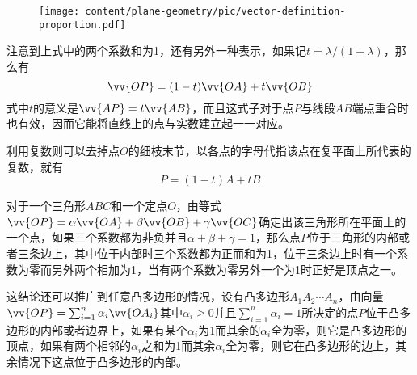 \begin{figure}[htbp]
\centering
\texttt{[image: content/plane-geometry/pic/vector-definition-proportion.pdf]}
\caption{}
\label{fig:vector-definition-proportion}
\end{figure}

注意到上式中的两个系数和为1，还有另外一种表示，如果记$t= \lambda / (1+\lambda)$，那么有
\begin{equation}
  \label{eq:vector-definition-proportion-t}
  \vv{OP} = (1-t) \vv{OA} + t \vv{OB}
\end{equation}
式中$t$的意义是$\vv{AP} = t \vv{AB}$，而且这式子对于点$P$与线段$AB$端点重合时也有效，因而它能将直线上的点与实数建立起一一对应。

利用复数则可以去掉点$O$的细枝末节，以各点的字母代指该点在复平面上所代表的复数，就有
\begin{equation}
  \label{eq:complex-definition-proportion}
  P = (1-t)A + tB
\end{equation}

\begin{example}
  对于一个三角形$ABC$和一个定点$O$，由等式$\vv{OP} = \alpha \vv{OA} + \beta \vv{OB} + \gamma \vv{OC}$确定出该三角形所在平面上的一个点，如果三个系数都为非负并且$\alpha+\beta+\gamma = 1$，那么点$P$位于三角形的内部或者三条边上，其中位于内部时三个系数都为正而和为1，位于三条边上时有一个系数为零而另外两个相加为1，当有两个系数为零另外一个为1时正好是顶点之一。

  这结论还可以推广到任意凸多边形的情况，设有凸多边形$A_1A_2\cdots A_n$，由向量$\vv{OP}=\sum_{i=1}^n\alpha_i\vv{OA_i}$其中$\alpha_i\geqslant 0$并且$\sum_{i=1}^n\alpha_i=1$所决定的点$P$位于凸多边形的内部或者边界上，如果有某个$\alpha_i$为1而其余的$\alpha_i$全为零，则它是凸多边形的顶点，如果有两个相邻的$\alpha_i$之和为1而其余$\alpha_i$全为零，则它在凸多边形的边上，其余情况下这点位于凸多边形的内部。
\end{example}

